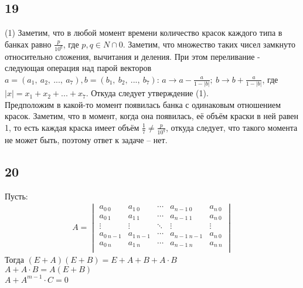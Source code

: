 		\subsection{19}
		(1) Заметим, что в любой момент времени количество красок каждого типа в банках равно $\frac{p}{10^q}$, где $p,q \in N \cap {0}$.
		Заметим, что множество таких чисел замкнуто относительно сложения, вычитания и деления. При этом переливание - следующая операция над парой векторов $a = (a_1,\ a_2,\ ... ,\ a_7), b = (b_1,\ b_2,\ ... ,\ b_7)$: $a \to a - \frac{a}{1 - |b|};\ b \to b + \frac{a}{1 - |b|}$, где $|x| = x_1 + x_2 + ... + x_7$. Откуда следует утверждение (1).\\
		Предположим в какой-то момент появилась банка с одинаковым отношением красок. Заметим, что в момент, когда она появилась, её объём краски в ней равен 1, то есть каждая краска имеет объём $\frac{1}{7} \ne \frac{p}{10^q}$, откуда следует, что такого момента не может быть, поэтому ответ к задаче -- нет.
		
		\subsection{20}	
		Пусть:\\
		\begin{gather*}
			A = 
			\begin{vmatrix}
				a_{0\ 0} & a_{1\ 0} & \cdots & a_{n-1\ 0} & a_{n\ 0}\\
				a_{0\ 1} & a_{1\ 1} & \cdots & a_{n-1\ 1} & a_{n\ 0}\\
				\vdots & \vdots & \ddots & \vdots & \vdots\\
				a_{0\ n-1} & a_{1\ n-1} & \cdots & a_{n-1\ n-1} & a_{n\ 0}\\
				a_{0\ n} & a_{1\ n} & \cdots & a_{n-1\ n} & a_{n\ n}\\
			\end{vmatrix}
		\end{gather*}
		Тогда $(E + A)(E + B) = E + A + B + A \cdot B$\\
		$A + A \cdot B = A(E + B)$\\
		$A + A^{m-1} \cdot C = 0$